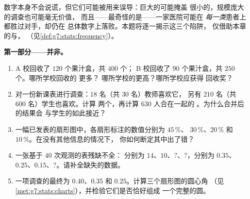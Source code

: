 \begin{problem}
\label{pb:g7:stats:1}
数字本身不会说谎，但它们可能被用来误导：巨大的可能掩盖
很小的，规模庞大的调查也可能毫无价值，
而且——最奇怪的是——一家医院可能在
\emph{每一类}患者上都胜过对手，却仍在
总体数字上落败。本题将逐一揭示这三个陷阱，
仅借助本章的与，
（见\cref{def:g7:stats:frequency}）。

\medskip
\noindent\textbf{第一部分——并非。}
\begin{enumerate}
  \item A 校回收了 $120$ 个果汁盒，共 $400$ 个；
        B 校回收了 $90$ 个果汁盒，共 $250$ 个。哪所学校回收的
        \emph{}更多？
        哪所学校的\emph{}更高？哪所学校应获得
        回收奖？
  \item 对一份新课表进行调查：$18$ 名（共 $30$ 名）教师喜欢它，
        另有 $210$ 名（共 $600$ 名）学生也喜欢。计算
        两个，再计算 $630$ 人合在一起的
        。为什么合并后的结果会
        与学生的如此接近？
  \item 一幅已发表的扇形图中，各扇形标注的数值分别为 $45\,\%$、
        $30\,\%$、$20\,\%$ 和 $10\,\%$。在没有其他信息的情况下，
        你如何断定其中出了错？
  \item 一张基于 $40$ 次观测的表残缺不全：
        分别为 $14$、$10$、$?$、$?$，分别为 $0.35$、
        $0.25$、$0.15$、$?$。请补全缺失的数据。
  \item 一项调查的最终为 $0.40$、$0.35$ 和
        $0.25$。计算三个扇形图的圆心角
        （见\cref{met:g7:stats:charts}），并检验它们是否恰好组成
        一个完整的圆。
\end{enumerate}


\end{problem}
